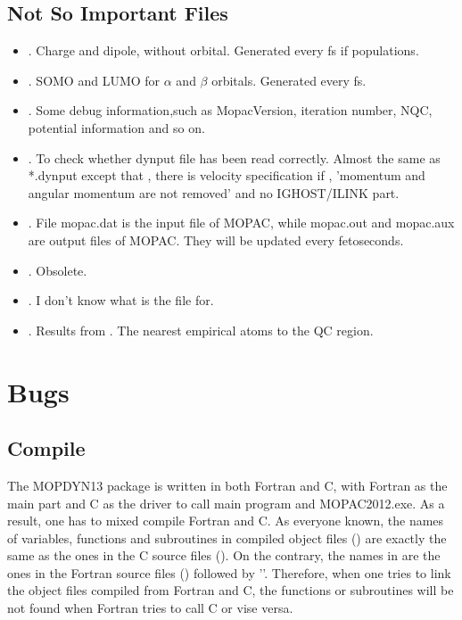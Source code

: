 \documentclass[11pt]{JHEP3}
\begin{document}
\subsection{Not So Important Files}
\begin{itemize}
\item {}. Charge and dipole, without orbital. Generated every  fs if 
populations.

\item {}. SOMO and LUMO for $\alpha$ and $\beta$ orbitals. Generated every
 fs.

\item {}. Some debug information,such as MopacVersion,
iteration number, NQC, potential information and so on.

\item {}. To check whether dynput file has been read correctly.
Almost the same as *.dynput except that , there
is velocity specification if  , 'momentum and angular
momentum are not removed' and no IGHOST/ILINK part.

\item {}. File mopac.dat is the input file of MOPAC,
while mopac.out and mopac.aux are output files of MOPAC. They will
be updated every  fetoseconds.

\item {}. Obsolete.

\item {}. I don't know what is the file for.

\item {}. Results from . The nearest  empirical atoms to the QC
region.
\end{itemize}


\section{Bugs}
\subsection{Compile}
The MOPDYN13 package is written in both Fortran and C, with Fortran
as the main part and C as the driver to call main program and
MOPAC2012.exe. As a result, one has to mixed compile Fortran and C.
As everyone known, the names of variables, functions and subroutines
in compiled object files () are exactly the same as the
ones in the C source files (). On the contrary, the names
in  are the ones in the Fortran source files
() followed by '\mcode{_}'. Therefore, when one tries to
link the object files compiled from Fortran and C, the functions or
subroutines will be not found when Fortran tries to call C or  vise
versa.
\end{document}
